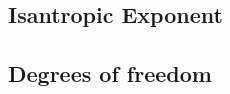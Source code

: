 \documentclass[../main.tex]{subfiles}
\begin{document}
        

\subsection{Isantropic Exponent}
    

\subsection{Degrees of freedom}
    
    
\end{document}
